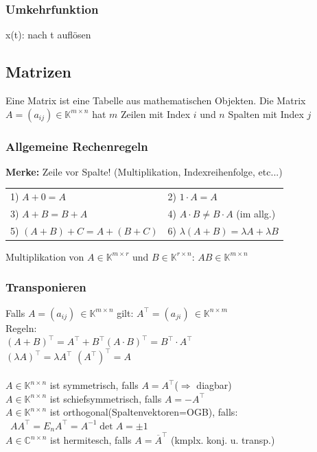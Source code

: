 \documentclass[6pt,a4paper]{scrartcl}
\begin{document}
\begin{multicols}{4}
\subsubsection{Umkehrfunktion}
x(t): nach t auflösen\\

\subsection{Matrizen}
Eine Matrix ist eine Tabelle aus mathematischen Objekten.
Die Matrix $A=(a_{ij}) \in \mathbb K^{m\times n}$ hat $m$ Zeilen mit Index $i$ und $n$ Spalten mit Index $j$

\subsubsection{Allgemeine Rechenregeln}
\textbf{Merke:} Zeile vor Spalte! (Multiplikation, Indexreihenfolge, etc...)\\

\begin{tabular}{ll}	
	1)  $A+0=A$ & 2)  $1 \cdot A=A$ \\
	3)  $A+B=B+A$ & 4) $A \cdot B \ne B \cdot A$ (im allg.) \\
	5)  $(A+B)+C=A+(B+C)$ & 6) $\lambda (A+B) = \lambda A + \lambda B$\\ 
\end{tabular}
Multiplikation von $A\in \mathbb K^{m\times r}$ und $B\in \mathbb K^{r\times n}$: $AB\in\mathbb K^{m\times n}$

\subsubsection{Transponieren}
Falls $A=(a_{ij})\ \in \mathbb K^{m\times n}$ gilt: $A^\top=(a_{ji})\ \in \mathbb K^{n\times m}$\\
Regeln:\\
$(A+B)^\top=A^\top+B^\top$\qquad $(A\cdot B)^\top=B^\top\cdot A^\top$\qquad \\ $(\lambda A)^\top=\lambda A^\top$ \qquad $(A^\top)^\top=A$\\
\\
$A\in \mathbb K^{n\times n}$ ist symmetrisch, falls $A=A^\top$\qquad ($\Rightarrow$ diagbar)\\
$A\in \mathbb K^{n\times n}$ ist schiefsymmetrisch, falls $A=-A^\top$\\
$A\in \mathbb K^{n\times n}$ ist orthogonal(Spaltenvektoren=OGB), falls:\\
\qquad\ $AA^\top=E_n$\qquad $A^\top=A^{-1}$\qquad $\det A=\pm 1$\\
$A\in \mathbb C^{n\times n}$ ist hermitesch, falls $A=\overline{A}^\top$  \quad (kmplx. konj. u. transp.)



\end{multicols}
\end{document}
